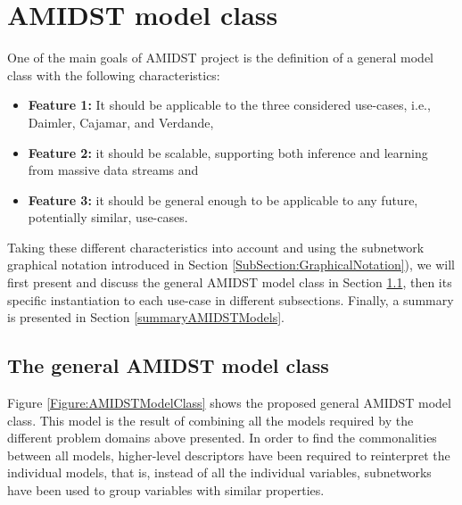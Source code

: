 \section{AMIDST model class}\label{section:AMIDSTmodelClass}


One of the main goals of AMIDST project is the definition of a general model class with the following characteristics: 

\begin{itemize}
\item \textbf{Feature 1:} It should be applicable to the three considered use-cases, i.e., Daimler, Cajamar, and Verdande,

\item \textbf{Feature 2:} it should be scalable, supporting both inference and learning from massive data streams and

\item \textbf{Feature 3:}  it should be general enough to be applicable to any future, potentially similar, use-cases.

\end{itemize}

Taking these different characteristics into account and using the subnetwork graphical notation introduced in Section \ref{SubSection:GraphicalNotation}), we will first present and discuss the general AMIDST model class in Section \ref{GeneralModelClass}, then its specific instantiation to each use-case in different subsections. Finally, a summary is presented in Section \ref{summaryAMIDSTModels}.

\subsection{The general AMIDST model class}\label{GeneralModelClass}

Figure \ref{Figure:AMIDSTModelClass} shows the proposed general AMIDST model class. This model is the result of combining all the models required by the different problem domains above presented. In order to find the commonalities between all models, higher-level descriptors have been required to reinterpret the individual models, that is, instead of all the individual variables, subnetworks have been used to group variables with similar properties.


